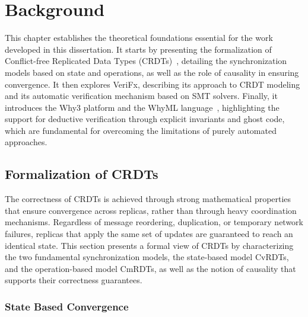 
%

\makeatletter
\newcommand{\ntifpkgloaded}{%
  \@ifpackageloaded%
}
\makeatother


\chapter{Background}
\label{cha:background}

This chapter establishes the theoretical foundations essential for the work developed in this dissertation. It starts by presenting the formalization of Conflict-free Replicated Data Types (CRDTs)~\cite{preguica2018overview}, detailing the synchronization models based on state and operations, as well as the role of causality in ensuring convergence. It then explores VeriFx, describing its approach to CRDT modeling and its automatic verification mechanism based on SMT solvers. Finally, it introduces the Why3 platform and the WhyML language~\cite{whyml}, highlighting the support for deductive verification through explicit invariants and ghost code, which are fundamental for overcoming the limitations of purely automated approaches.

\section{Formalization of CRDTs}
\label{sec:document_structure}

The correctness of CRDTs is achieved through strong mathematical properties that ensure convergence across replicas, rather than through heavy coordination mechanisms. Regardless of message reordering, duplication, or temporary network failures, replicas that apply the same set of updates are guaranteed to reach an identical state. This section presents a formal view of CRDTs by characterizing the two fundamental synchronization models, the state-based model CvRDTs, and the operation-based model CmRDTs, as well as the notion of causality that supports their correctness guarantees.

\subsection{State Based Convergence}
\label{sub:state_convergence}

